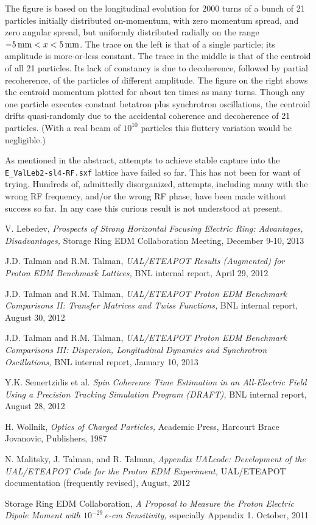 \documentclass[12]{article}
\begin{document}
The figure is based on 
the longitudinal evolution for 2000 turns of a bunch of 21 particles
initially distributed on-momentum, with zero momentum spread,
and zero angular spread, but uniformly distributed 
radially on the range $-5\,{\rm mm}<x<5\,{\rm mm}$.
The trace on the left is that of a single particle; its
amplitude is more-or-less constant. The trace in the middle is 
that of the centroid of all 21 particles. Its lack of constancy
is due to decoherence, followed by partial recoherence, of
the particles of different amplitude. The figure on the right
shows the centroid momentum plotted for about ten times as many
turns.  Though any one particle executes constant betatron plus
synchrotron oscillations, the centroid drifts quasi-randomly
due to the accidental coherence and decoherence of 21 
particles. (With a real beam of $10^{10}$ particles this fluttery
variation would be negligible.)

As mentioned in the abstract, attempts to achieve stable capture 
into the {\tt E\_ValLeb2-sl4-RF.sxf} lattice have failed so far.
This has not been for want of trying. Hundreds of, admittedly disorganized, 
attempts, including many with the wrong RF frequency, and/or the wrong
RF phase, have been made without success so far. In any case this curious
result is not understood at present.

\begin{thebibliography}{99}
V. Lebedev, \emph{Prospects of Strong Horizontal Focusing Electric Ring:
Advantages, Disadvantages,} Storage Ring EDM
Collaboration Meeting, December 9-10, 2013 

J.D. Talman and R.M. Talman, \emph{ UAL/ETEAPOT Results 
(Augmented) for Proton EDM Benchmark Lattices,} BNL internal
report, April 29, 2012

J.D. Talman and R.M. Talman, \emph{ UAL/ETEAPOT Proton EDM 
Benchmark Comparisons II: Transfer Matrices and Twiss Functions,} 
BNL internal report, August 30, 2012

J.D. Talman and R.M. Talman, \emph{ UAL/ETEAPOT Proton EDM Benchmark 
Comparisons III: Dispersion, Longitudinal Dynamics and Synchrotron 
Oscillations,} BNL internal report, January 10, 2013

Y.K. Semertzidis et al. \emph{Spin Coherence Time Estimation in an All-Electric Field 
Using a Precision Tracking Simulation Program (DRAFT),}  
BNL internal report, August 28, 2012

H. Wollnik, \emph{Optics of Charged Particles,} Academic Press, Harcourt
Brace Jovanovic, Publishers, 1987

N. Malitsky, J. Talman, and R. Talman, \emph{Appendix UALcode: Development of the
UAL/ETEAPOT Code for the Proton EDM Experiment,} UAL/ETEAPOT documentation
(frequently revised), August, 2012

Storage Ring EDM Collaboration, \emph{A Proposal to Measure the
Proton Electric Dipole Moment with $10^{-29}\,$e-cm Sensitivity,}
especially Appendix 1. October, 2011

\end{thebibliography}
\end{document}
